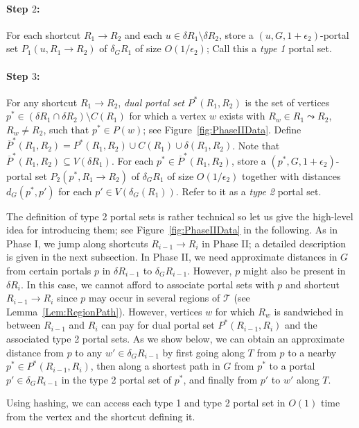 \documentclass[11pt]{article}
\begin{document}
\paragraph{Step $2$:} For each shortcut $R_1\rightarrow R_2$ and each $u\in\delta R_1\setminus\delta R_2$, store a $(u,G,1+\epsilon_2)$-portal set $P_1(u,R_1\rightarrow R_2)$ of $\delta_G R_1$ of size $O(1/\epsilon_2)$; Call this a \emph{type 1} portal set.

\paragraph{Step $3$:} For any shortcut $R_1\rightarrow R_2$, \emph{dual portal set} $P^*(R_1,R_2)$ is the set of vertices $p^*\in(\delta R_1\cap\delta R_2)\setminus C(R_1)$ for which a vertex $w$ exists with $R_w\in R_1\leadsto R_2$, $R_w\neq R_2$, such that $p^*\in P(w)$; see Figure~\ref{fig:PhaseIIData}.
Define $\overline P^*(R_1,R_2) = P^*(R_1,R_2)\cup C(R_1)\cup\delta(R_1,R_2)$. Note that $\overline P^*(R_1,R_2)\subseteq V(\delta R_1)$. For each $p^*\in \overline P^*(R_1,R_2)$, store a $(p^*,G,1+\epsilon_2)$-portal set $P_2(p^*,R_1\rightarrow R_2)$ of $\delta_G R_1$ of size $O(1/\epsilon_2)$ together with distances $d_G(p^*,p')$ for each $p'\in V(\delta_G(R_1))$. Refer to it as a \emph{type 2} portal set.

The definition of type 2 portal sets is rather technical so let us give the high-level idea for introducing them; see Figure~\ref{fig:PhaseIIData} in the following. As in Phase I, we jump along shortcuts $R_{i-1}\rightarrow R_i$ in Phase II; a detailed description is given in the next subsection. In Phase II, we need approximate distances in $G$ from certain portals $p$ in $\delta R_{i-1}$ to $\delta_G R_{i-1}$. However, $p$ might also be present in $\delta R_i$. In this case, we cannot afford to associate portal sets with $p$ and shortcut $R_{i-1}\rightarrow R_i$ since $p$ may occur in several regions of $\mathcal T$ (see Lemma~\ref{Lem:RegionPath}). However, vertices $w$ for which $R_w$ is sandwiched in between $R_{i-1}$ and $R_i$ can pay for dual portal set $P^*(R_{i-1},R_i)$ and the associated type 2 portal sets. As we show below, we can obtain an approximate distance from $p$ to any $w'\in\delta_G R_{i-1}$ by first going along $T$ from $p$ to a nearby $p^*\in P^*(R_{i-1},R_i)$, then along a shortest path in $G$ from $p^*$ to a portal $p'\in\delta_G R_{i-1}$ in the type 2 portal set of $p^*$, and finally from $p'$ to $w'$ along $T$.

Using hashing, we can access each type 1 and type 2 portal set in $O(1)$ time from the vertex and the shortcut defining it.
\end{document}
